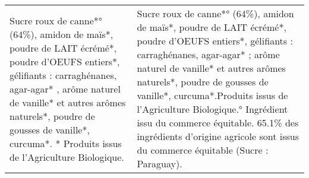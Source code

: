 \begin{tabular}{p{7cm}p{7cm}}
                                                                                                                                                                                                                                                                                                                                                                                                                                                                                                                                                                                                                                                                                                                                                                                                                                                                                                                                                                                                                                                                                                                                                                                                                                                                                                                                                                                                                                 Sucre roux de canne*°(64\%), amidon de maïs*, poudre de LAIT écrémé*, poudre d'OEUFS entiers*, gélifiants : carraghénanes, agar-agar* , arôme naturel de vanille* et autres arômes naturels*, poudre de gousses de vanille*, curcuma*. * Produits issus de l'Agriculture Biologique. &                                                                                                                                Sucre roux de canne*° (64\%), amidon de maïs*, poudre de LAIT écrémé*, poudre d'OEUFS entiers*, gélifiants : carraghénanes, agar-agar* ; arôme naturel de vanille* et autres arômes naturels*, poudre de gousses de vanille*, curcuma*.\newline * Produits issus de l'Agriculture Biologique.\newline ° Ingrédient issu du commerce équitable. 65.1\% des ingrédients d'origine agricole sont issus du commerce équitable (Sucre : Paraguay). \\

\end{tabular}
